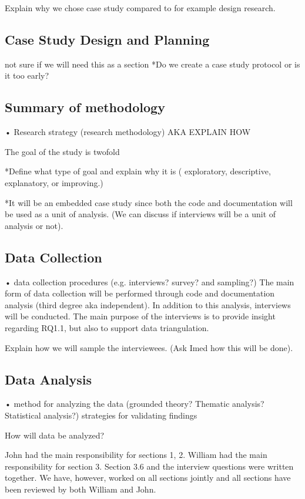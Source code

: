 \documentclass[10pt,twocolumn]{article}
\begin{document}
Explain why we chose case study compared to for example design research.


\subsection{Case Study Design and Planning}

not sure if we will need this as a section
*Do we create a case study protocol or is it too early?

\subsection{Summary of methodology}

• Research strategy (research methodology) 
AKA EXPLAIN HOW

The goal of the study is twofold

*Define what type of goal and explain why it is ( exploratory, descriptive, explanatory, or improving.)

*It will be an embedded case study since both the code and documentation will be used as a unit of analysis. (We can discuss if interviews will be a unit of analysis or not).



\subsection{Data Collection}
• data collection procedures (e.g. interviews? survey? and sampling?) 
The main form of data collection will be performed through code and documentation analysis (third degree aka independent). In addition to this analysis, interviews will be conducted. The main purpose of the interviews is to provide insight regarding RQ1.1, but also to support data triangulation. 

Explain how we will sample the interviewees. (Ask Imed how this will be done).


\subsection{Data Analysis}
• method for analyzing the data (grounded theory? Thematic analysis? Statistical analysis?) strategies for validating findings

How will data be analyzed?









John had the main responsibility for sections 1, 2. William had the main responsibility for section 3. Section 3.6 and the interview questions were written together. We have, however, worked on all sections jointly and all sections have been reviewed by both William and John. 


\noindent
\end{document}
